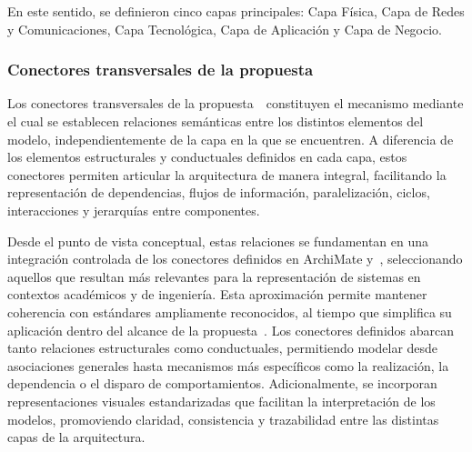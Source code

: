 En este sentido, se definieron cinco capas principales: Capa Física, Capa de Redes y Comunicaciones, Capa Tecnológica, Capa de Aplicación y Capa de Negocio.

\subsubsection{Conectores transversales de la propuesta~\NDITI}
\noindent

Los conectores transversales de la propuesta~\NDITI~constituyen el mecanismo mediante el cual se establecen relaciones semánticas entre los distintos elementos del modelo, independientemente de la capa en la que se encuentren. A diferencia de los elementos estructurales y conductuales definidos en cada capa, estos conectores permiten articular la arquitectura de manera integral, facilitando la representación de dependencias, flujos de información, paralelización, ciclos, interacciones y jerarquías entre componentes.

Desde el punto de vista conceptual, estas relaciones se fundamentan en una integración controlada de los conectores definidos en ArchiMate y~\UML{}, seleccionando aquellos que resultan más relevantes para la representación de sistemas en contextos académicos y de ingeniería. Esta aproximación permite mantener coherencia con estándares ampliamente reconocidos, al tiempo que simplifica su aplicación dentro del alcance de la propuesta~\NDITI. Los conectores definidos abarcan tanto relaciones estructurales como conductuales, permitiendo modelar desde asociaciones generales hasta mecanismos más específicos como la realización, la dependencia o el disparo de comportamientos. Adicionalmente, se incorporan representaciones visuales estandarizadas que facilitan la interpretación de los modelos, promoviendo claridad, consistencia y trazabilidad entre las distintas capas de la arquitectura.

\renewcommand{\arraystretch}{1.3}
\setlength{\extrarowheight}{2pt}
\fontsize{8.5pt}{10pt}\selectfont

